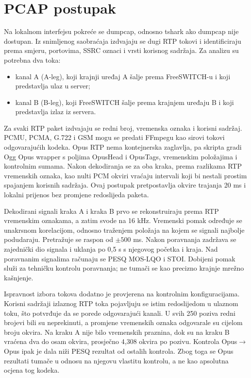 \section{PCAP postupak}

Na lokalnom interfejsu pokreće se dumpcap, odnosno tshark ako dumpcap nije dostupan. Iz snimljenog saobraćaja izdvajaju se dugi RTP tokovi i identificiraju prema smjeru, portovima, SSRC oznaci i vrsti korisnog sadržaja. Za analizu su potrebna dva toka:

\begin{itemize}
    \item kanal A (A-leg), koji krajnji uređaj A šalje prema FreeSWITCH-u i koji predstavlja ulaz u server;
    \item kanal B (B-leg), koji FreeSWITCH šalje prema krajnjem uređaju B i koji predstavlja izlaz iz servera.
\end{itemize}

Za svaki RTP paket izdvajaju se redni broj, vremenska oznaka i korisni sadržaj. PCMU, PCMA, G.722 i GSM mogu se predati FFmpegu kao sirovi tokovi odgovarajućih kodeka. Opus RTP nema kontejnerska zaglavlja, pa skripta gradi Ogg Opus wrapper s poljima OpusHead i OpusTags, vremenskim položajima i kontrolnim sumama. Nakon dekodiranja se za oba kraka, prema razlikama RTP vremenskih oznaka, kao nulti PCM okviri vraćaju intervali koji bi nestali prostim spajanjem korisnih sadržaja. Ovaj postupak pretpostavlja okvire trajanja 20 ms i lokalni prijenos bez promjene redoslijeda paketa.

Dekodirani signali kraka A i kraka B prvo se rekonstruiraju prema RTP vremenskim oznakama, a zatim svode na 16 kHz. Vremenski pomak određuje se unakrsnom korelacijom, odnosno traženjem položaja na kojem se signali najbolje podudaraju. Pretražuje se raspon od $\pm500$ ms. Nakon poravnanja zadržava se zajednički dio signala i uklanja po 0,5 s s njegovog početka i kraja. Nad poravnanim signalima računaju se PESQ MOS-LQO i STOI. Dobijeni pomak služi za tehničku kontrolu poravnanja; ne tumači se kao precizno krajnje mrežno kašnjenje.

Ispravnost izbora tokova dodatno je provjerena na kontrolnim konfiguracijama. Korisni sadržaji izlaznog RTP toka pojavljuju se istim redoslijedom u ulaznom toku, što potvrđuje da se porede odgovarajući kanali. U svih 250 poziva redni brojevi bili su neprekinuti, a promjene vremenskih oznaka odgovarale su cijelom broju okvira. Na kraku A nije bilo vremenskih praznina, dok su na kraku B vraćena dva do osam okvira, prosječno 4,308 okvira po pozivu. Kontrola Opus$\rightarrow$Opus ipak je dala niži PESQ rezultat od ostalih kontrola. Zbog toga se Opus rezultati tumače u odnosu na njegovu vlastitu kontrolu, a ne kao apsolutna ocjena tog kodeka.

